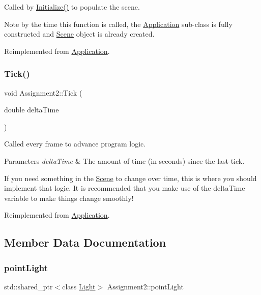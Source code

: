 Called by \hyperlink{class_application_a17cf1ea4552d26a1c20f7d98d793d41d}{Initialize()} to populate the scene. 

Note by the time this function is called, the \hyperlink{class_application}{Application} sub-\/class is fully constructed and \hyperlink{class_scene}{Scene} object is already created. 

Reimplemented from \hyperlink{class_application_aa8e8017ef8dd86293c96d0645e66d440}{Application}.

\hypertarget{class_assignment2_a41544ad361dd798d5fae1ec3197fc66e}{}\label{class_assignment2_a41544ad361dd798d5fae1ec3197fc66e} 
\subsubsection{\texorpdfstring{Tick()}{Tick()}}
{\footnotesize\ttfamily void Assignment2\+::\+Tick (\begin{DoxyParamCaption}\item[{double}]{delta\+Time }\end{DoxyParamCaption})\hspace{0.3cm}{\ttfamily [virtual]}}



Called every frame to advance program logic. 


\begin{DoxyParams}{Parameters}
{\em delta\+Time} & The amount of time (in seconds) since the last tick.\\
\hline
\end{DoxyParams}
If you need something in the \hyperlink{class_scene}{Scene} to change over time, this is where you should implement that logic. It is recommended that you make use of the delta\+Time variable to make things change smoothly! 

Reimplemented from \hyperlink{class_application_a0800afd5651153d31fa775a8048d14dd}{Application}.



\subsection{Member Data Documentation}
\hypertarget{class_assignment2_abaf6127e0de097717673c0d9b04f8c79}{}\label{class_assignment2_abaf6127e0de097717673c0d9b04f8c79} 
\subsubsection{\texorpdfstring{point\+Light}{pointLight}}
{\footnotesize\ttfamily std\+::shared\+\_\+ptr$<$class \hyperlink{class_light}{Light}$>$ Assignment2\+::point\+Light\hspace{0.3cm}{\ttfamily [private]}}

